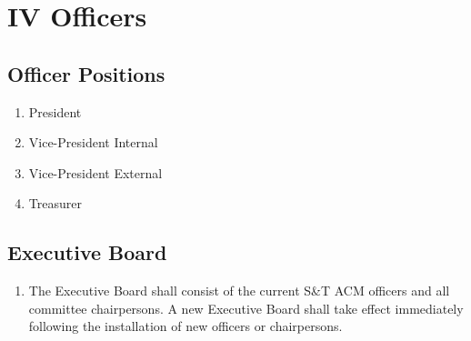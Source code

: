 \section{IV \textendash{} Officers}
\subsection{Officer Positions}
\begin{enumerate}
  \item President
  \item Vice-President Internal
  \item Vice-President External
  \item Treasurer
\end{enumerate}
\subsection{Executive Board}
\begin{enumerate}
  \item The Executive Board shall consist of the current S\&T ACM officers and
    all committee chairpersons. A new Executive Board shall take effect
    immediately following the installation of new officers or chairpersons.
\end{enumerate}

